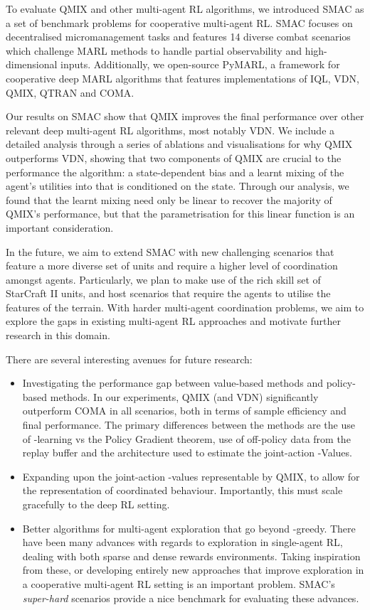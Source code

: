\documentclass[twoside,11pt]{article}
\begin{document}
To evaluate QMIX and other multi-agent RL algorithms, we introduced SMAC as a set of benchmark problems for cooperative multi-agent RL.
SMAC focuses on decentralised
micromanagement tasks and features 14 diverse combat scenarios which challenge
MARL methods to handle partial observability and high-dimensional inputs. Additionally, we
open-source PyMARL, a framework for cooperative deep MARL algorithms that features implementations of IQL, VDN, QMIX, QTRAN and COMA.

Our results on SMAC show that QMIX improves the final performance over other relevant deep multi-agent RL algorithms, most notably VDN. 
We include a detailed analysis through a series of ablations and visualisations for why QMIX outperforms VDN, showing that two components of QMIX are crucial to the performance the algorithm: a state-dependent bias and a learnt mixing of the agent's utilities into  that is conditioned on the state.
Through our analysis, we found that the learnt mixing need only be linear to recover the majority of QMIX's performance, but that the parametrisation for this linear function is an important consideration.

In the future, we aim to extend SMAC with new challenging scenarios that
feature a more diverse set of units and require a higher level of coordination
amongst agents. Particularly, we plan to make use of the rich skill set of
StarCraft II units, and host scenarios that require the agents to utilise the
features of the terrain. With harder multi-agent coordination problems, we aim to explore the
gaps in existing multi-agent RL approaches and motivate further research in this domain.

There are several interesting avenues for future research:
\begin{itemize}
	\item Investigating the performance gap between value-based methods and policy-based methods. 
	In our experiments, QMIX (and VDN) significantly outperform COMA in all scenarios, both in terms of sample efficiency and final performance. The primary differences between the methods are the use of -learning vs the Policy Gradient theorem, use of off-policy data from the replay buffer and the architecture used to estimate the joint-action -Values.
	\item Expanding upon the joint-action -values representable by QMIX, to allow for the representation of coordinated behaviour. Importantly, this must scale gracefully to the deep RL setting.
	\item Better algorithms for multi-agent exploration that go beyond -greedy. There have been many advances with regards to exploration in single-agent RL, dealing with both sparse and dense rewards environments. Taking inspiration from these, or developing entirely new approaches that improve exploration in a cooperative multi-agent RL setting is an important problem. SMAC's \textit{super-hard} scenarios provide a nice benchmark for evaluating these advances. 
\end{itemize}
\end{document}
